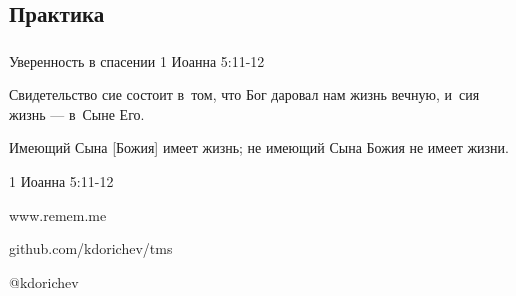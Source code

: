 \documentclass[t,aspectratio=169,14pt]{beamer}  %
\begin{document}
\subsection{Практика}
\begin{frame}[c]
	\frametitle{\insertsection}
	\framesubtitle{\insertsubsection}
	\begin{center}

  \begin{block}{Уверенность в спасении}
	1 Иоанна 5:11-12	 
	 \vspace{6pt}

	 Свидетельство сие состоит в~том, \newline
	 что Бог даровал нам жизнь вечную, \newline
	 и~сия жизнь — в~Сыне Его. %
	 \vspace{5pt}

	 Имеющий\hspace{1cm} Сына [Божия] \hspace{0.9cm} имеет жизнь; \newline
	 не имеющий\hspace{0.5cm} Сына Божия \hspace{0.5cm} не имеет жизни.
	 \begin{flushright}
		1 Иоанна 5:11-12
	\end{flushright}
\end{block}
\end{center}
\end{frame}
\begin{frame}[c]
\begin{center}
	\LARGE www.remem.me

	\LARGE github.com/kdorichev/tms	

	\LARGE @kdorichev
\end{center}
\end{frame}
\end{document}
